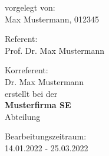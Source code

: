 \begin{titlepage}
\begin{center}
      vorgelegt von:\\
      Max Mustermann, 012345\\
  
      \vspace{0.75cm}
  
      Referent:\\
      Prof. Dr. Max Mustermann\\
  
      \vspace{0.25cm}
  
      Korreferent:\\
      Dr. Max Mustermann\\
  
      \vspace{0.75cm}
      erstellt bei der\\
      \textbf{Musterfirma SE}\\
      Abteilung
  
      \vfill
  
      
      Bearbeitungszeitraum:\\
      14.01.2022 - 25.03.2022
        
    \end{center}
\end{titlepage}
\restoregeometry